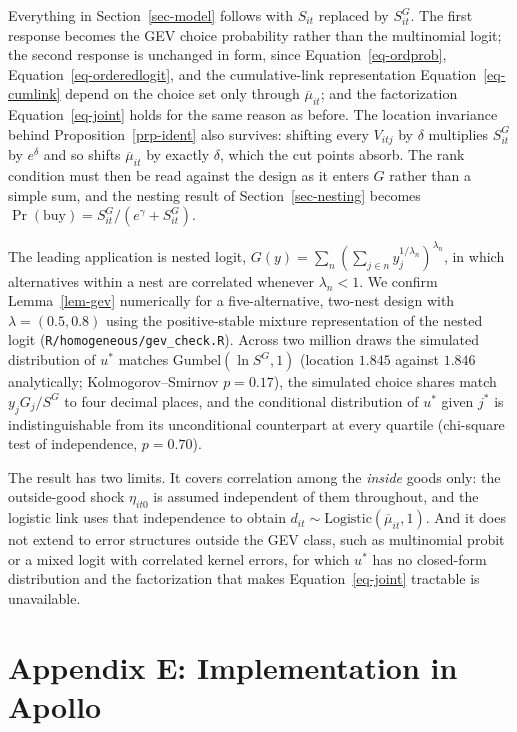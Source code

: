 \documentclass[
  letterpaper,
  DIV=11,
  numbers=noendperiod]{scrartcl}
\theoremstyle{plain}
\theoremstyle{plain}
\theoremstyle{plain}
\theoremstyle{remark}
\begin{document}
Everything in Section~\ref{sec-model} follows with \(S_{it}\) replaced
by \(S^{G}_{it}\). The first response becomes the GEV choice probability
rather than the multinomial logit; the second response is unchanged in
form, since Equation~\ref{eq-ordprob}, Equation~\ref{eq-orderedlogit},
and the cumulative-link representation Equation~\ref{eq-cumlink} depend
on the choice set only through \(\overline{\mu}_{it}\); and the
factorization Equation~\ref{eq-joint} holds for the same reason as
before. The location invariance behind Proposition~\ref{prp-ident} also
survives: shifting every \(V_{itj}\) by \(\delta\) multiplies
\(S^{G}_{it}\) by \(e^{\delta}\) and so shifts \(\overline{\mu}_{it}\)
by exactly \(\delta\), which the cut points absorb. The rank condition
must then be read against the design as it enters \(G\) rather than a
simple sum, and the nesting result of Section~\ref{sec-nesting} becomes
\(\Pr(\text{buy}) = S^{G}_{it} / \left( e^{\gamma} + S^{G}_{it} \right)\).

The leading application is nested logit,
\(G(y) = \sum_{n} \left( \sum_{j \in n} y_j^{1/\lambda_n} \right)^{\lambda_n}\),
in which alternatives within a nest are correlated whenever
\(\lambda_n < 1\). We confirm Lemma~\ref{lem-gev} numerically for a
five-alternative, two-nest design with \(\lambda = (0.5, 0.8)\) using
the positive-stable mixture representation of the nested logit
(\texttt{R/homogeneous/gev\_check.R}). Across two million draws the
simulated distribution of \(u^*\) matches
\(\text{Gumbel}(\ln S^{G}, 1)\) (location \(1.845\) against \(1.846\)
analytically; Kolmogorov--Smirnov \(p = 0.17\)), the simulated choice
shares match \(y_j G_j / S^{G}\) to four decimal places, and the
conditional distribution of \(u^*\) given \(j^*\) is indistinguishable
from its unconditional counterpart at every quartile (chi-square test of
independence, \(p = 0.70\)).

The result has two limits. It covers correlation among the \emph{inside}
goods only: the outside-good shock \(\eta_{it0}\) is assumed independent
of them throughout, and the logistic link uses that independence to
obtain \(d_{it} \sim \text{Logistic}(\overline{\mu}_{it}, 1)\). And it
does not extend to error structures outside the GEV class, such as
multinomial probit or a mixed logit with correlated kernel errors, for
which \(u^*\) has no closed-form distribution and the factorization that
makes Equation~\ref{eq-joint} tractable is unavailable.

\section*{Appendix E: Implementation in
Apollo}\label{sec-appendix-apollo}
\end{document}

